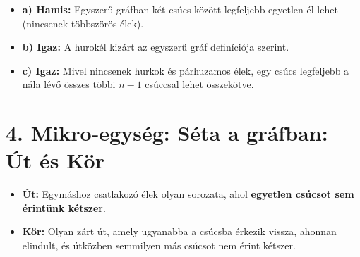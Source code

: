 \documentclass[a4paper,12pt]{article}
\begin{document}
\begin{megoldasdoboz}
\begin{itemize}
    \item \textbf{a) Hamis:} Egyszerű gráfban két csúcs között legfeljebb egyetlen él lehet (nincsenek többszörös élek).
    \item \textbf{b) Igaz:} A hurokél kizárt az egyszerű gráf definíciója szerint.
    \item \textbf{c) Igaz:} Mivel nincsenek hurkok és párhuzamos élek, egy csúcs legfeljebb a nála lévő összes többi $n-1$ csúccsal lehet összekötve.
\end{itemize}
\end{megoldasdoboz}

\vspace{0.4cm}
\section{4. Mikro-egység: Séta a gráfban: Út és Kör}

\begin{definiciodoboz}[Út és Kör]
\begin{itemize}
    \item \textbf{Út:} Egymáshoz csatlakozó élek olyan sorozata, ahol \textbf{egyetlen csúcsot sem érintünk kétszer}.
    \item \textbf{Kör:} Olyan zárt út, amely ugyanabba a csúcsba érkezik vissza, ahonnan elindult, és útközben semmilyen más csúcsot nem érint kétszer.
\end{itemize}
\end{definiciodoboz}
\end{document}
